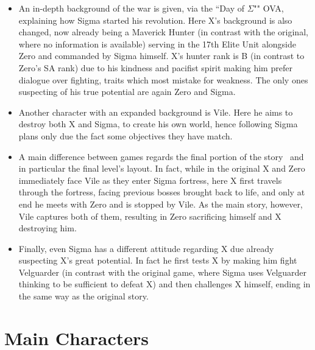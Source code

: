 \begin{itemize}
	\item An in-depth background of the war is given, via the ``Day of $\Sigma$"" OVA, explaining how Sigma started his revolution. Here X's background is also changed, now already being a Maverick Hunter (in contrast with the original, where no information is available) serving in the 17th Elite Unit alongside Zero and commanded by Sigma himself. X's hunter rank is B (in contrast to Zero's SA rank) due to his kindness and pacifist spirit making him prefer dialogue over fighting, traits which most mistake for weakness. The only ones suspecting of his true potential are again Zero and Sigma. 
	
	\item Another character with an expanded background is Vile. Here he aims to destroy both X and Sigma, to create his own world, hence following Sigma plans only due the fact some objectives they have match.
	
	\item A main difference between games regards the final portion of the story~\cite{wiki:MM_MHX_script} and in particular the final level's layout. In fact, while in the original X and Zero immediately face Vile as they enter Sigma fortress, here X first travels through the fortress, facing previous bosses brought back to life, and only at end he meets with Zero and is stopped by Vile. As the main story, however, Vile captures both of them, resulting in Zero sacrificing himself and X destroying him. 
	\item Finally, even Sigma has a different attitude regarding X due already suspecting X's great potential. In fact he first tests X by making him fight Velguarder (in contrast with the original game, where Sigma uses Velguarder thinking to be sufficient to defeat X) and then challenges X himself, ending in the same way as the original story.	
\end{itemize}

\section{Main Characters}
